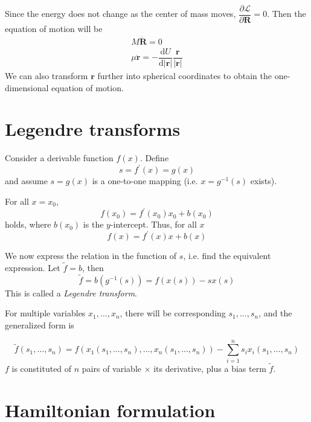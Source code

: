 \documentclass[
  10pt,
  twoside,
  openany,
  b5paper, %
  colorscheme = bootstrap-v4, %
]{qyxf-book}
\numberwithin{equation}{section}
\newcommand{\md}{\mathrm{d}}
\newcommand{\der}[2]{\dfrac{\md #1}{\md #2}}
\newcommand{\p}[2]{\dfrac{\partial #1}{\partial #2}}
\newcommand{\vr}{\boldsymbol{r}}
\newcommand{\ddvr}{\ddot{\vr}}
\newcommand{\lag}{\mathcal{L}} %
\begin{document}
Since the energy does not change as the center of mass moves, $\p{\lag}{\boldsymbol{R}}=0$. Then the equation of motion will be
\begin{gather*}
	M\ddot{\boldsymbol{R}}=0\\
	\mu\ddvr=-\der{U}{|\vr|}\dfrac{\vr}{|\vr|}
\end{gather*}
We can also transform $\vr$ further into spherical coordinates to obtain the one-dimensional equation of motion.

\section{Legendre transforms}

Consider a derivable function $f(x)$. Define
\begin{equation}
	s=f^\prime(x)=g(x)
\end{equation}
and assume $s=g(x)$ is a one-to-one mapping (i.e. $x=g^{-1}(s)$ exists).

For all $x=x_0$, 
\begin{equation*}
	f(x_0)=f^\prime(x_0)x_0+b(x_0)
\end{equation*}
holds, where $b(x_0)$ is the $y$-intercept. Thus, for all $x$
\begin{equation}
	f(x)=f^\prime(x)x+b(x)
\end{equation}

We now express the relation in the function of $s$, i.e. find the equivalent expression. Let $\tilde{f}=b$, then
\begin{equation}
	\tilde{f}=b(g^{-1}(s))=f(x(s))-sx(s)
\end{equation}
This is called a \textit{Legendre transform}.

For multiple variables $x_1, \dots, x_n$, there will be corresponding $s_1, \dots, s_n$, and the generalized form is
\begin{tcolorbox}
	\begin{equation}
		\tilde{f}(s_1, \dots, s_n)=f(x_1(s_1, \dots, s_n),\dots,x_n(s_1, \dots, s_n))-\sum_{i=1}^{n}s_ix_i(s_1, \dots, s_n)
	\end{equation}
	$f$ is constituted of $n$ pairs of variable $\times$ its derivative, plus a bias term $\tilde{f}$.
\end{tcolorbox}

\section{Hamiltonian formulation}
\end{document}
